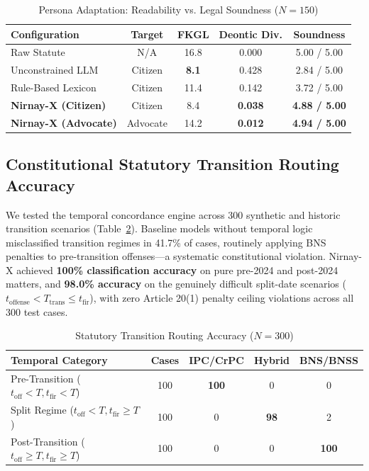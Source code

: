 \documentclass[conference]{IEEEtran}
\begin{document}
\begin{table}[!t]
\caption{Persona Adaptation: Readability vs. Legal Soundness ($N=150$)}
\label{tab:persona}
\centering
\footnotesize
\setlength{\tabcolsep}{2.5pt}
\begin{tabularx}{\columnwidth}{>{\raggedright\arraybackslash}Xcccc}
\toprule
\textbf{Configuration} & \textbf{Target} & \textbf{FKGL} & \textbf{Deontic Div.} & \textbf{Soundness} \\
\midrule
Raw Statute & N/A & 16.8 & 0.000 & 5.00 / 5.00 \\
Unconstrained LLM & Citizen & \textbf{8.1} & 0.428 & 2.84 / 5.00 \\
Rule-Based Lexicon & Citizen & 11.4 & 0.142 & 3.72 / 5.00 \\
\midrule
\textbf{Nirnay-X (Citizen)} & Citizen & 8.4 & \textbf{0.038} & \textbf{4.88 / 5.00} \\
\textbf{Nirnay-X (Advocate)} & Advocate & 14.2 & \textbf{0.012} & \textbf{4.94 / 5.00} \\
\bottomrule
\end{tabularx}
\end{table}

\subsection{Constitutional Statutory Transition Routing Accuracy}
We tested the temporal concordance engine across 300 synthetic and historic transition scenarios (Table~\ref{tab:transition_matrix}). Baseline models without temporal logic misclassified transition regimes in 41.7\% of cases, routinely applying BNS penalties to pre-transition offenses---a systematic constitutional violation. Nirnay-X achieved \textbf{100\% classification accuracy} on pure pre-2024 and post-2024 matters, and \textbf{98.0\% accuracy} on the genuinely difficult split-date scenarios ($t_{\text{offense}} < T_{\text{trans}} \le t_{\text{fir}}$), with zero Article 20(1) penalty ceiling violations across all 300 test cases.

\begin{table}[!t]
\caption{Statutory Transition Routing Accuracy ($N=300$)}
\label{tab:transition_matrix}
\centering
\footnotesize
\setlength{\tabcolsep}{2.5pt}
\begin{tabularx}{\columnwidth}{>{\raggedright\arraybackslash}Xcccc}
\toprule
\textbf{Temporal Category} & \textbf{Cases} & \textbf{IPC/CrPC} & \textbf{Hybrid} & \textbf{BNS/BNSS} \\
\midrule
Pre-Transition ($t_{\text{off}} < T, t_{\text{fir}} < T$) & 100 & \textbf{100} & 0 & 0 \\
Split Regime ($t_{\text{off}} < T, t_{\text{fir}} \ge T$) & 100 & 0 & \textbf{98} & 2 \\
Post-Transition ($t_{\text{off}} \ge T, t_{\text{fir}} \ge T$) & 100 & 0 & 0 & \textbf{100} \\
\bottomrule
\end{tabularx}
\end{table}
\end{document}
